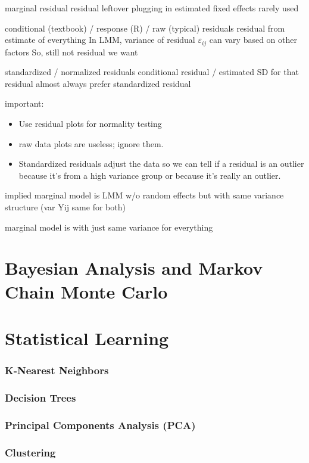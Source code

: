 \documentclass[english]{article}
\begin{document}
\begin{multicols*}{2}
marginal residual
	residual leftover plugging in estimated fixed effects
	rarely used
	
conditional (textbook) / response (R) / raw (typical) residuals
	residual from estimate of everything
	In LMM, variance of residual $\varepsilon_{ij}$ can vary based on other factors
	So, still not residual we want

	
standardized / normalized residuals
	conditional residual / estimated SD for that residual
	almost always prefer standardized residual
	
important:
\begin{itemize}
	\item	Use residual plots for normality testing
	\item	raw data plots are useless; ignore them.
	\item	Standardized residuals adjust the data so we can tell if a residual is an outlier because it's from a high variance group or because it's really an outlier.
\end{itemize}


implied marginal model is LMM w/o random effects but with same variance structure (var Yij same for both)

marginal model is with just same variance for everything 

\newpage
\part{Bayesian Analysis and Markov Chain Monte Carlo}\label{part:BAandMCMC}



\newpage
\part{Statistical Learning}\label{part:statLearn}
\section{K-Nearest Neighbors}\label{sec:KNN}


\newpage
\section{Decision Trees}


\newpage
\section{Principal Components Analysis (PCA)}\label{sec:PCA}


\newpage
\section{Clustering}





\end{multicols*}
\end{document}

